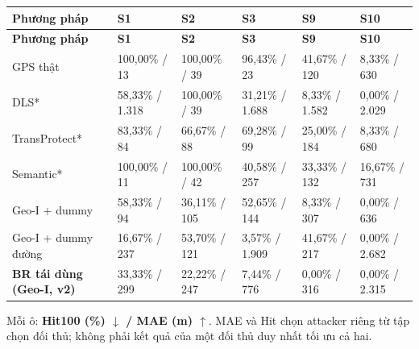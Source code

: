 \documentclass[10pt,a4paper]{article}
\begin{document}
\begingroup\small
\begin{longtable}{@{}P{3.364cm}P{2.486cm}P{2.486cm}P{2.486cm}P{2.486cm}P{2.486cm}@{}}
\toprule
\textbf{Phương pháp} & \textbf{S1} & \textbf{S2} & \textbf{S3} & \textbf{S9} & \textbf{S10}\\\midrule
\endfirsthead
\toprule
\textbf{Phương pháp} & \textbf{S1} & \textbf{S2} & \textbf{S3} & \textbf{S9} & \textbf{S10}\\\midrule
\endhead
\bottomrule\endfoot
GPS thật & 100,00\% / 13 & 100,00\% / 39 & 96,43\% / 23 & 41,67\% / 120 & 8,33\% / 630\\
\addlinespace[3pt]
DLS* & 58,33\% / 1.318 & 100,00\% / 39 & 31,21\% / 1.688 & 8,33\% / 1.582 & 0,00\% / 2.029\\
\addlinespace[3pt]
TransProtect* & 83,33\% / 84 & 66,67\% / 88 & 69,28\% / 99 & 25,00\% / 184 & 8,33\% / 680\\
\addlinespace[3pt]
Semantic* & 100,00\% / 11 & 100,00\% / 42 & 40,58\% / 257 & 33,33\% / 132 & 16,67\% / 731\\
\addlinespace[3pt]
Geo-I + dummy & 58,33\% / 94 & 36,11\% / 105 & 52,65\% / 144 & 8,33\% / 307 & 0,00\% / 636\\
\addlinespace[3pt]
Geo-I + dummy đường & 16,67\% / 237 & 53,70\% / 121 & 3,57\% / 1.909 & 41,67\% / 217 & 0,00\% / 2.682\\
\addlinespace[3pt]
\textbf{BR tái dùng (Geo-I, v2)} & 33,33\% / 299 & 22,22\% / 247 & 7,44\% / 776 & 0,00\% / 316 & 0,00\% / 2.315\\
\end{longtable}
\endgroup
Mỗi ô: \textbf{Hit100 (\%) $\downarrow$ / MAE (m) $\uparrow$}. MAE và Hit chọn attacker riêng từ tập chọn đối thủ; không phải kết quả của một đối thủ duy nhất tối ưu cả hai.
\end{document}
